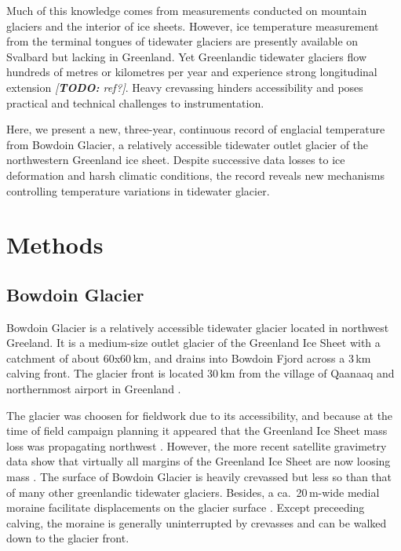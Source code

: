 \documentclass[utf8]{article}
\newcommand{\todo}[1]{\textcolor{c3}{\emph{[\textbf{TODO:} #1]}}}
\begin{document}
    Much of this knowledge comes from measurements conducted on mountain
    glaciers and the interior of ice sheets. However, ice temperature
    measurement from the terminal tongues of tidewater glaciers are presently
    available on Svalbard \citep{Jania.etal.1996} but lacking in Greenland.
    Yet Greenlandic tidewater glaciers flow hundreds of metres or kilometres
    per year and experience strong longitudinal extension \todo{ref?}. Heavy
    crevassing hinders accessibility and poses practical and technical
    challenges to instrumentation.

    Here, we present a new, three-year, continuous record of englacial
    temperature from Bowdoin Glacier, a relatively accessible tidewater outlet
    glacier of the northwestern Greenland ice sheet. Despite successive data
    losses to ice deformation and harsh climatic conditions, the record reveals
    new mechanisms controlling temperature variations in tidewater glacier.


\section{Methods}

\subsection{Bowdoin Glacier}

    Bowdoin Glacier is a relatively accessible tidewater glacier located in
    northwest Greeland. It is a medium-size outlet glacier of the Greenland
    Ice Sheet with a catchment of about 60x60\,km, and drains into Bowdoin
    Fjord across a 3\,km calving front. The glacier front is located 30\,km
    from the village of Qaanaaq and northernmost airport in Greenland
    \citep[Fig.~1]{Sugiyama.etal.2015}.

    The glacier was choosen for fieldwork due to its accessibility, and
    because at the time of field campaign planning it appeared that the
    Greenland Ice Sheet mass loss was propagating northwest
    \citep{Khan.etal.2010}. However, the more recent satellite gravimetry data
    show that virtually all margins of the Greenland Ice Sheet are now loosing
    mass \citep{Groh.Horwath.2016}. The surface of Bowdoin Glacier
    is heavily crevassed but less so than that of many other greenlandic
    tidewater glaciers. Besides, a ca.~20\,m-wide medial moraine facilitate
    displacements on the glacier surface \citep[Figs.~68]{Chamberlin.1897}.
    Except preceeding calving, the moraine is generally uninterrupted by
    crevasses and can be walked down to the glacier front.
\end{document}
